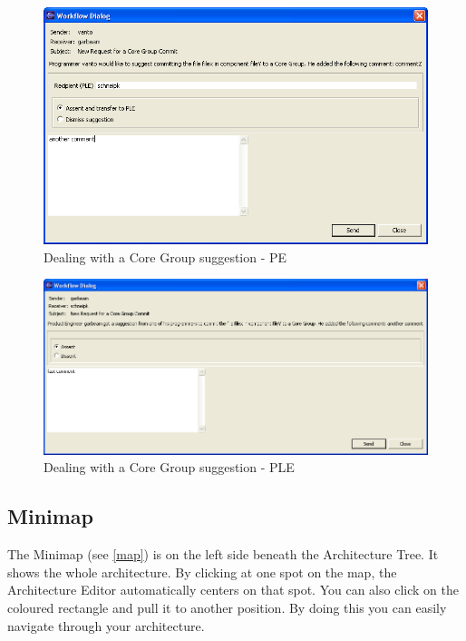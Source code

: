\begin{figure}[h!]
\begin{center}
\includegraphics[width=14cm]{core2.png}
   \caption{Dealing with a Core Group suggestion - PE}
\label{core2}
\end{center}
\end{figure}\par

\begin{figure}[h!]
\begin{center}
\includegraphics[width=14cm]{core3.png}
   \caption{Dealing with a Core Group suggestion - PLE}
\label{core3}
\end{center}
\end{figure}\par


\subsection{Minimap}

The Minimap (see \ref{map}) is on the left side beneath the Architecture Tree. It shows the whole architecture.
By clicking at one spot on the map, the Architecture Editor automatically centers on that
spot. You can also click on the coloured rectangle and pull it to another position. 
By doing this you can easily navigate through your architecture.

